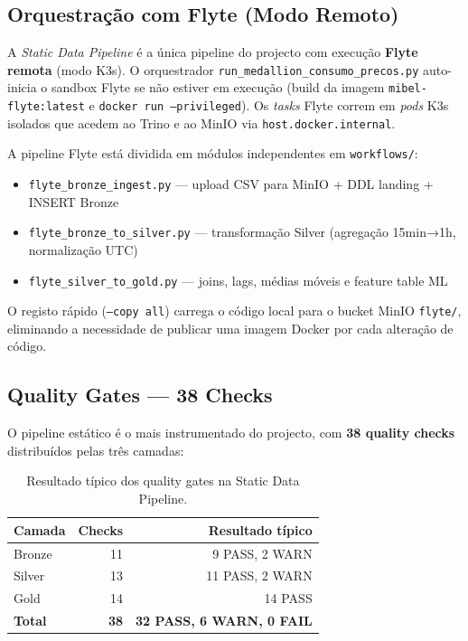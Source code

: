 \documentclass[11pt,a4paper]{article}
\begin{document}
\subsection{Orquestração com Flyte (Modo Remoto)}

A \textit{Static Data Pipeline} é a única pipeline do projecto com execução \textbf{Flyte remota} (modo K3s). O orquestrador \texttt{run\_medallion\_consumo\_precos.py} auto-inicia o sandbox Flyte se não estiver em execução (build da imagem \texttt{mibel-flyte:latest} e \texttt{docker run --privileged}). Os \textit{tasks} Flyte correm em \textit{pods} K3s isolados que acedem ao Trino e ao MinIO via \texttt{host.docker.internal}.

A pipeline Flyte está dividida em módulos independentes em \texttt{workflows/}:

\begin{itemize}[leftmargin=*,noitemsep]
  \item \texttt{flyte\_bronze\_ingest.py} — upload CSV para MinIO + DDL landing + INSERT Bronze
  \item \texttt{flyte\_bronze\_to\_silver.py} — transformação Silver (agregação 15min→1h, normalização UTC)
  \item \texttt{flyte\_silver\_to\_gold.py} — joins, lags, médias móveis e feature table ML
\end{itemize}

O registo rápido (\texttt{--copy all}) carrega o código local para o bucket MinIO \texttt{flyte/}, eliminando a necessidade de publicar uma imagem Docker por cada alteração de código.

\subsection{Quality Gates — 38 Checks}

O pipeline estático é o mais instrumentado do projecto, com \textbf{38 quality checks} distribuídos pelas três camadas:

\begin{table}[h!]
\centering
\begin{tabular}{lrr}
\toprule
\textbf{Camada} & \textbf{Checks} & \textbf{Resultado típico} \\
\midrule
Bronze & 11 & 9 PASS, 2 WARN \\
Silver & 13 & 11 PASS, 2 WARN \\
Gold   & 14 & 14 PASS \\
\midrule
\textbf{Total} & \textbf{38} & \textbf{32 PASS, 6 WARN, 0 FAIL} \\
\bottomrule
\end{tabular}
\caption{Resultado típico dos quality gates na Static Data Pipeline.}
\end{table}
\end{document}
